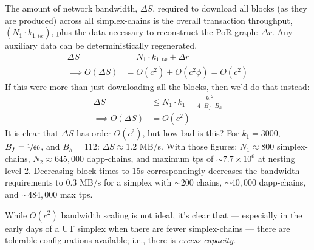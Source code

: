The amount of network bandwidth, \(\Delta S\), required to download all blocks (as they are produced) across all simplex-chains is the overall transaction throughput, $(N_1 \cdot k_{1,tx})$, plus the data necessary to reconstruct the PoR graph: $\Delta r$.
Any auxiliary data can be deterministically regenerated.
\begin{equation}
\begin{split}
\Delta S &= N_1 \cdot k_{1,tx} + \Delta r
\label{eq:bandwidth-req} \\
\implies O(\Delta S) &= O(c^2) + O(c^2 \phi) = O(c^2) \nonumber
\end{split}
\end{equation}
If this were more than just downloading all the blocks, then we'd do that instead:
\begin{equation}
\begin{split}
\Delta S &\le N_1 \cdot k_1 = \frac{{k_1}^2}{4 \cdot B_f \cdot B_h} \nonumber \\
\implies O(\Delta S) &= O(c^2) \nonumber
\end{split}
\end{equation}
It is clear that \(\Delta S\) has order \(O(c^2)\), but how bad is this?
For \(k_1 = 3000\), \(B_f = \nicefrac{1}{60}\), and \(B_h = 112\): \(\Delta S \approx 1.2\) MB/s.
With those figures: \(N_1 \approx 800\) simplex-chains, \(N_2 \approx 645,000\) dapp-chains, and maximum tps of \(\sim 7.7\times 10^{6}\) at nesting level 2.
Decreasing block times to 15s correspondingly decreases the bandwidth requirements to 0.3 MB/s for a simplex with \(\sim 200\) chains, \(\sim 40,000\) dapp-chains, and \(\sim 484,000\) max tps.

While \(O(c^2)\) bandwidth scaling is not ideal, it's clear that --- especially in the early days of a UT simplex when there are fewer simplex-chains --- there are tolerable configurations available; i.e., there is \emph{excess capacity}.
